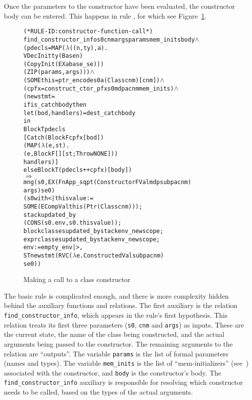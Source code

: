 \documentclass[11pt]{article}
\begin{document}
Once the parameters to the constructor have been evaluated, the
constructor body can be entered.  This happens in rule
, for which see
Figure~\ref{fig:constructor-function-call}.
\begin{figure}[htbp]
\begin{center}
\begin{minipage}{\textwidth}
%
\begin{alltt}
(* RULE-ID: constructor-function-call *)
     find_constructor_info s0 cnm args params mem_inits body \(\land\)
     (pdecls = MAP (\(\lambda\)((n,ty),a).
                        VDecInit ty (Base n)
                                    (CopyInit (EX a base_se)))
                   (ZIP (params, args))) \(\land\)
     (SOME this = ptr_encode s0 a (Class cnm) [cnm]) \(\land\)
     (cpfx = construct_ctor_pfx s0 mdp a cnm mem_inits) \(\land\)
     (newstmt =
        if is_catch body then
          let (bod,handlers) = dest_catch body
          in
            Block T pdecls
              [Catch (Block F cpfx [bod])
                     (MAP (\(\lambda\)(e,st).
                             (e, Block F [] [st; Throw NONE]))
                          handlers)]
        else Block T (pdecls ++ cpfx) [body])
   \(\Rightarrow\)
     mng (s0, EX (FnApp_sqpt (ConstructorFVal mdp subp a cnm)
                             args) se0)
         (s0 with <| thisvalue :=
                       SOME (ECompVal this (Ptr (Class cnm)));
                     stack updated_by
                       (CONS (s0.env, s0.thisvalue));
                     blockclasses updated_by stackenv_newscope;
                     exprclasses updated_by stackenv_newscope;
                     env := empty_env |>,
          ST newstmt (RVC (\(\lambda\)e. ConstructedVal subp a cnm)
                          se0))
\end{alltt}
    \end{minipage}
  \end{center}

  \caption{Making a call to a class constructor}
\label{fig:constructor-function-call}
\end{figure}
The basic rule is complicated enough, and there is more complexity
hidden behind the auxiliary functions and relations.  The first
auxiliary is the relation \texttt{find_constructor_info}, which
appears in the rule's first hypothesis.  This relation treats its
first three parameters (\texttt{s0}, \texttt{cnm} and \texttt{args})
as inputs.  These are the current state, the name of the class being
constructed, and the actual arguments being passed to the constructor.
The remaining arguments to the relation are ``outputs''.  The variable
\texttt{params} is the list of formal parameters (names and types).
The variable \texttt{mem_inits} is the list of ``mem-initializers''
(see~\cite[\S12.6.2]{cpp-standard-iso14882}) associated with the
constructor, and \texttt{body} is the constructor's body.  The
\texttt{find_constructor_info} auxiliary is responsible for resolving
which constructor needs to be called, based on the types of the actual
arguments.
\end{document}
